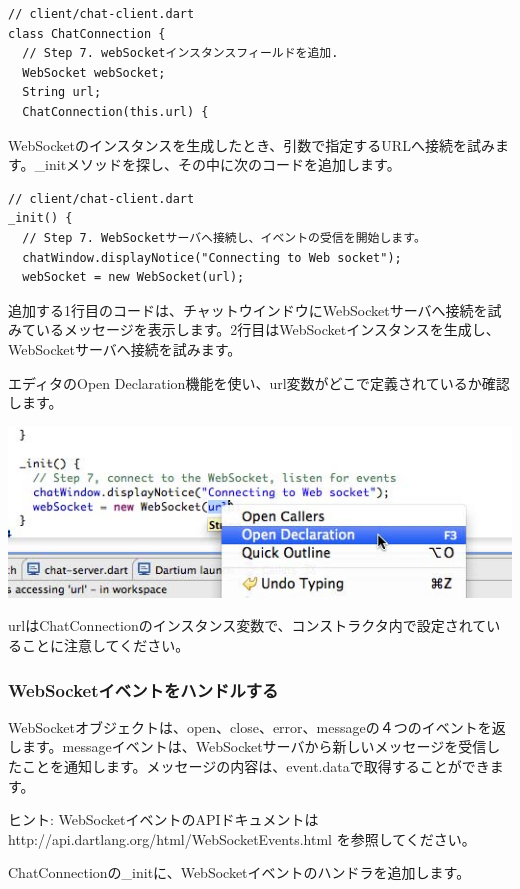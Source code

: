 \begin{verbatim}
// client/chat-client.dart
class ChatConnection {
  // Step 7. webSocketインスタンスフィールドを追加.
  WebSocket webSocket;
  String url;
  ChatConnection(this.url) {
\end{verbatim}

WebSocketのインスタンスを生成したとき、引数で指定するURLへ接続を試みます。\_initメソッドを探し、その中に次のコードを追加します。

\begin{verbatim}
// client/chat-client.dart
_init() {
  // Step 7. WebSocketサーバへ接続し、イベントの受信を開始します。
  chatWindow.displayNotice("Connecting to Web socket");
  webSocket = new WebSocket(url);
\end{verbatim}

追加する1行目のコードは、チャットウインドウにWebSocketサーバへ接続を試みているメッセージを表示します。2行目はWebSocketインスタンスを生成し、WebSocketサーバへ接続を試みます。

エディタのOpen Declaration機能を使い、url変数がどこで定義されているか確認します。

\includegraphics{step7/img_56.jpg}

urlはChatConnectionのインスタンス変数で、コンストラクタ内で設定されていることに注意してください。

\subsubsection{WebSocketイベントをハンドルする}

WebSocketオブジェクトは、open、close、error、messageの４つのイベントを返します。messageイベントは、WebSocketサーバから新しいメッセージを受信したことを通知します。メッセージの内容は、event.dataで取得することができます。

ヒント: WebSocketイベントのAPIドキュメントは http://api.dartlang.org/html/WebSocketEvents.html を参照してください。

ChatConnectionの\_initに、WebSocketイベントのハンドラを追加します。

